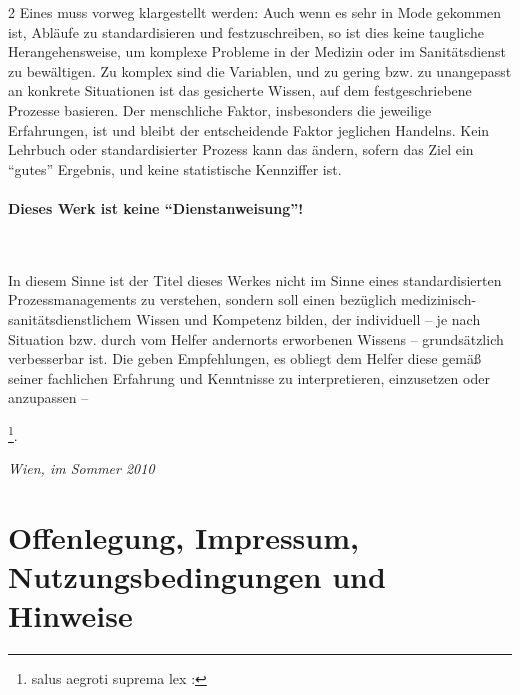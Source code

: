 \documentclass[
ngerman,
paper=a4,
asymmetric,
fontsize=9pt,
draft=false,
parskip=half,
bibtotocnumbered,
footnotes=multiple,
toc=flat,
]{scrbook}
\begin{document}
\begin{multicols}{2}
  Eines muss vorweg klargestellt werden: Auch wenn es sehr in
Mode gekommen ist, Abläufe zu standardisieren und
festzuschreiben, so ist dies keine taugliche
Herangehensweise, um komplexe Probleme in der Medizin oder
im Sanitätsdienst zu bewältigen. Zu komplex sind die
Variablen, und zu gering bzw. zu unangepasst an konkrete
Situationen ist das gesicherte Wissen, auf dem
festgeschriebene Prozesse basieren. Der menschliche Faktor,
insbesonders die jeweilige Erfahrungen, ist und bleibt der
entscheidende Faktor jeglichen Handelns. Kein Lehrbuch oder
standardisierter Prozess kann das ändern, sofern das Ziel
ein "`gutes"' Ergebnis, und keine statistische Kennziffer
ist.
\end{multicols}

\paragraph{Dieses Werk ist keine "`Dienstanweisung"'!}~~



In diesem Sinne ist der Titel dieses Werkes nicht im Sinne eines
standardisierten Prozessmanagements zu verstehen, sondern soll einen
 bezüglich medizinisch-sanitätsdienstlichem Wissen und
Kompetenz bilden, der individuell -- je nach Situation bzw. durch vom Helfer
andernorts erworbenen Wissens -- grundsätzlich verbesserbar ist. Die {\AASS}
geben Empfehlungen, es obliegt dem Helfer diese gemäß seiner 
fachlichen Erfahrung und Kenntnisse zu interpretieren, einzusetzen oder
anzupassen -- 

\footnote{salus aegroti suprema lex : }.

\bigskip

\bigskip

\emph{Wien, im Sommer 2010}



\clearpage
\section{Offenlegung, Impressum, Nutzungsbedingungen und Hinweise}
\end{document}
